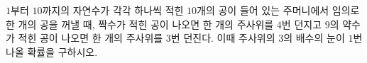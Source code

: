 $1$부터 $10$까지의 자연수가 각각 하나씩 적힌 $10$개의 공이 들어 있는 주머니에서 임의로 한 개의 공을 꺼낼 때, 짝수가 적힌 공이 나오면 한 개의 주사위를 $4$번 던지고 $9$의 약수가 적힌 공이 나오면 한 개의 주사위를 $3$번 던진다. 이때 주사위의 $3$의 배수의 눈이 $1$번 나올 확률을 구하시오. 
